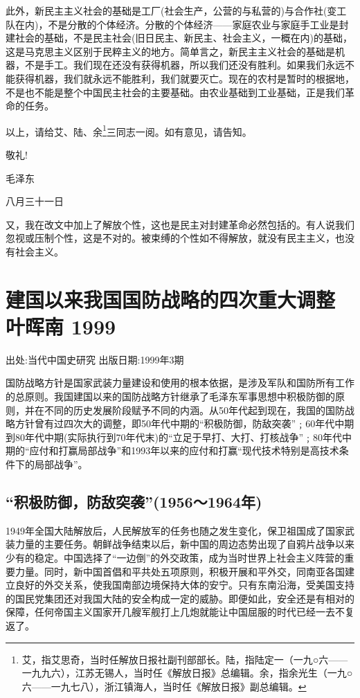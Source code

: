 \documentclass[UTF8, 12pt, a4paper]{ctexrep}
\begin{document}
此外，新民主主义社会的基础是工厂(社会生产，公营的与私营的)与合作社(变工队在内)，不是分散的个体经济。分散的个体经济——家庭农业与家庭手工业是封建社会的基础，不是民主社会(旧日民主、新民主、社会主义，一概在内)的基础，这是马克思主义区别于民粹主义的地方。简单言之，新民主主义社会的基础是机器，不是手工。我们现在还没有获得机器，所以我们还没有胜利。如果我们永远不能获得机器，我们就永远不能胜利，我们就要灭亡。现在的农村是暂时的根据地，不是也不能是整个中国民主社会的主要基础。由农业基础到工业基础，正是我们革命的任务。

以上，请给艾、陆、余\footnote{艾，指艾思奇，当时任解放日报社副刊部部长。陆，指陆定一（一九○六——一九九六），江苏无锡人，当时任《解放日报》总编辑。余，指余光生（一九○六——一九七八），浙江镇海人，当时任《解放日报》副总编辑。}三同志一阅。如有意见，请告知。

敬礼!

毛泽东

八月三十一日

又，我在改文中加上了解放个性，这也是民主对封建革命必然包括的。有人说我们忽视或压制个性，这是不对的。被束缚的个性如不得解放，就没有民主主义，也没有社会主义。

\newpage
\chapter{建国以来我国国防战略的四次重大调整 叶晖南 1999}

出处:当代中国史研究 出版日期:1999年3期

\newpage

国防战略方针是国家武装力量建设和使用的根本依据，是涉及军队和国防所有工作的总原则。我国建国以来的国防战略方针继承了毛泽东军事思想中积极防御的原则，并在不同的历史发展阶段赋予不同的内涵。从50年代起到现在，我国的国防战略方针曾有过四次大的调整，即50年代中期的“积极防御，防敌突袭”﹔60年代中期到80年代中期(实际执行到70年代末)的“立足于早打、大打、打核战争”﹔80年代中期的“应付和打赢局部战争”和1993年以来的应付和打赢“现代技术特别是高技术条件下的局部战争”。

\section{“积极防御，防敌突袭”(1956～1964年)}

1949年全国大陆解放后，人民解放军的任务也随之发生变化，保卫祖国成了国家武装力量的主要任务。朝鲜战争结束以后，新中国的周边态势出现了自鸦片战争以来少有的稳定。中国选择了“一边倒”的外交政策，成为当时世界上社会主义阵营的重要力量。同时，新中国首倡和平共处五项原则，积极开展和平外交，同南亚各国建立良好的外交关系，使我国南部边境保持大体的安宁。只有东南沿海，受美国支持的国民党集团还对我国大陆的安全构成一定的威胁。即便如此，安全还是有相对的保障，任何帝国主义国家开几艘军舰打上几炮就能让中国屈服的时代已经一去不复返了。
\end{document}
